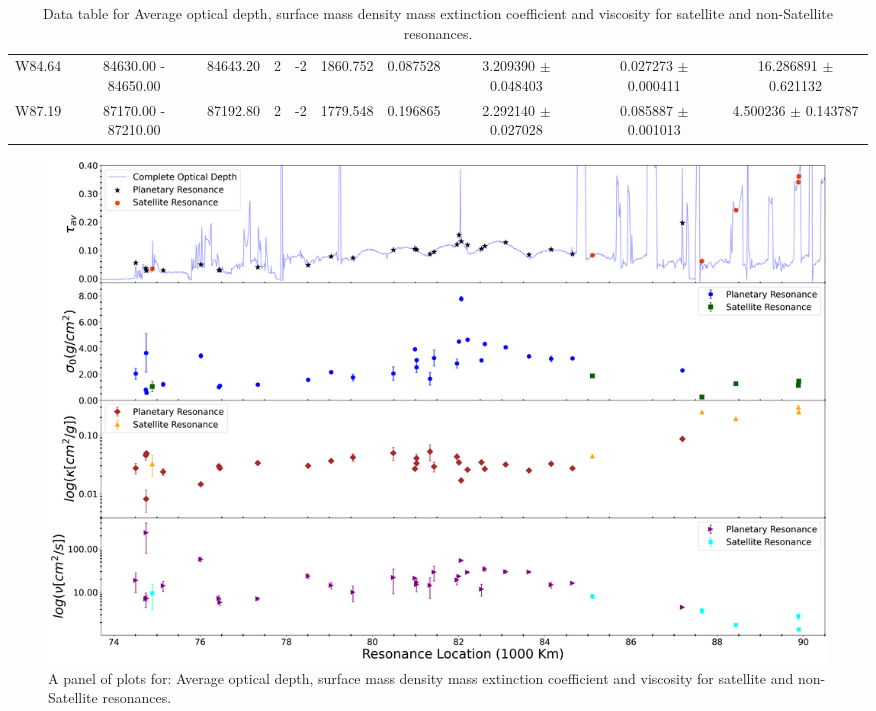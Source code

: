 \documentclass{article}
\begin{document}
\begin{table}[h]
{\begin{tabular}{|c|c|c|c|c|c|c|c|c|c|}
W84.64 & 84630.00 - 84650.00 & 84643.20 & 2 & -2 & 1860.752 & 0.087528 & 3.209390 $\pm$ 0.048403 & 0.027273 $\pm$ 0.000411 & 16.286891 $\pm$ 0.621132 \\
         
W87.19 & 87170.00 - 87210.00 & 87192.80 & 2 & -2 & 1779.548 & 0.196865 & 2.292140 $\pm$ 0.027028 & 0.085887 $\pm$ 0.001013 & 4.500236 $\pm$ 0.143787 \\

\hline
\end{tabular}
\vspace{-1.5cm}
}
\caption{Data table for Average optical depth, surface mass density mass extinction coefficient and viscosity for satellite and non-Satellite resonances.}
\end{table}

\begin{figure}[h]
    \centering
    \includegraphics[width=0.9\linewidth]{tau_sigma_kapp_nu_Updated.png}
    \caption{A panel of plots for: Average optical depth, surface mass density mass extinction coefficient and viscosity for satellite and non-Satellite resonances.}
    \label{fig:enter-label}
\end{figure}

\end{document}
